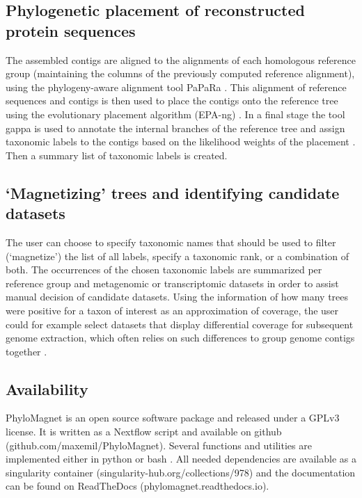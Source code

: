 \documentclass{bioinfo}
\begin{document}
\begin{methods}
\subsection{Phylogenetic placement of reconstructed protein sequences}
The assembled contigs are aligned to the alignments of each homologous reference group (maintaining the columns of the previously computed reference alignment), using the phylogeny-aware alignment tool PaPaRa \citep{Berger2011a}. This alignment of reference sequences and contigs is then used to place the contigs onto the reference tree using the evolutionary placement algorithm (EPA-ng) \citep{Berger2011b,Barbera2019}. In a final stage the tool gappa is used to annotate the internal branches of the reference tree and assign taxonomic labels to the contigs based on the likelihood weights of the placement \citep{Czech2018}. Then a summary list of taxonomic labels is created.

\subsection{‘Magnetizing’ trees and identifying candidate datasets}
The user can choose to specify taxonomic names that should be used to filter (‘magnetize’) the list of all labels, specify a taxonomic rank, or a combination of both. The occurrences of the chosen taxonomic labels are summarized per reference group and metagenomic or transcriptomic datasets  in order to assist manual decision of candidate datasets. Using the information of how many trees were positive for a taxon of interest as an approximation of coverage, the user could for example select datasets that display differential coverage for subsequent genome extraction, which often relies on such differences to group genome contigs together \citep{Albertsen2013,Alneberg2014}. 

\subsection{Availability}
PhyloMagnet is an open source software package and released under a GPLv3 license. It is written as a Nextflow \citep{DiTommaso2017} script and available on github (github.com/maxemil/PhyloMagnet). Several functions and utilities are implemented either in python or bash \citep{Dalke2009,Mckinney2010,Huerta-cepas2016a}. All needed dependencies are available as a singularity \citep{Kurtzer2017} container (singularity-hub.org/collections/978) and the documentation can be found on ReadTheDocs (phylomagnet.readthedocs.io).


\end{methods}
\end{document}
